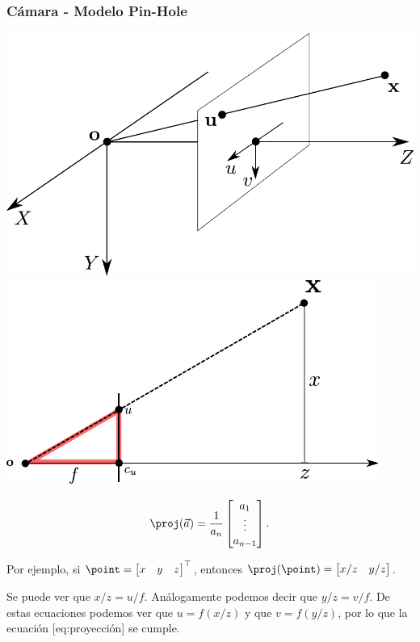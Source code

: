 \begin{frame}
    \frametitle{Cámara - Modelo Pin-Hole}
    
    \includegraphics[width=0.4\columnwidth]{images/pinhole_camera_model.pdf}
    \includegraphics[width=0.4\columnwidth]{images/pinhole_camera_model2.pdf}
    \footnotesize
    
    \begin{equation*}
        \proj(\vec{a})=
        \frac{1}{a_{n}}\begin{bmatrix}a_{1}\\
            \vdots\\
            a_{n-1}
        \end{bmatrix}.
    \end{equation*}
    
    Por ejemplo, si $\point=\begin{bmatrix}x & y & z\end{bmatrix}^{\top}$, entonces $\proj(\point)=\begin{bmatrix}x/z & y/z\end{bmatrix}$.
    
    Se puede ver que $x/z=u/f$. Análogamente podemos decir que $y/z=v/f$. De estas ecuaciones podemos ver que $u=f(x/z)$ y que $v=f(y/z)$, por lo que la ecuación [eq:proyección] se cumple.
    
\end{frame}

%    

